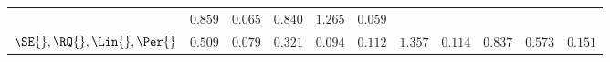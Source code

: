 \begin{table}[h]
{\begin{center}
\begin{tabularx}{\textwidth}{l | XXXXX | XXXXX}
& $\mathbf{0.859}$ & $\mathbf{0.065}$ & $\mathbf{0.840}$ & $1.265$ & $\mathbf{0.059}$ \\
$\SE{}, \RQ{}, \Lin{}, \Per{}$
& $\mathbf{0.509}$ & $\mathbf{0.079}$ & $\mathbf{0.321}$ & $\mathbf{0.094}$ & $\mathbf{0.112}$
& $\mathbf{1.357}$ & $\mathbf{0.114}$ & $\mathbf{0.837}$ & $\mathbf{0.573}$ & $\mathbf{0.151}$ \\
\end{tabularx}
\end{center}
}
\end{table}
%

\fi


